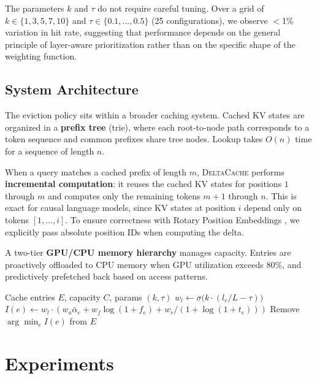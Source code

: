 \documentclass{article}
\newcommand{\deltacache}{\textsc{DeltaCache}}
\begin{document}
The parameters $k$ and $\tau$ do not require careful tuning. Over a grid of $k \in \{1,3,5,7,10\}$ and $\tau \in \{0.1,\ldots,0.5\}$ (25 configurations), we observe $<$1\% variation in hit rate, suggesting that performance depends on the general principle of layer-aware prioritization rather than on the specific shape of the weighting function.

\subsection{System Architecture}

The eviction policy sits within a broader caching system. Cached KV states are organized in a \textbf{prefix tree} (trie), where each root-to-node path corresponds to a token sequence and common prefixes share tree nodes. Lookup takes $O(n)$ time for a sequence of length $n$.

When a query matches a cached prefix of length $m$, \deltacache{} performs \textbf{incremental computation}: it reuses the cached KV states for positions $1$ through $m$ and computes only the remaining tokens $m{+}1$ through $n$. This is exact for causal language models, since KV states at position $i$ depend only on tokens $[1,\ldots,i]$. To ensure correctness with Rotary Position Embeddings \citep{su2024roformer}, we explicitly pass absolute position IDs when computing the delta.

A two-tier \textbf{GPU/CPU memory hierarchy} manages capacity. Entries are proactively offloaded to CPU memory when GPU utilization exceeds 80\%, and predictively prefetched back based on access patterns.

\begin{algorithm}[t]
\caption{Layer-Aware Cache Eviction}
\label{alg:eviction}
\begin{algorithmic}[1]
\Require Cache entries $E$, capacity $C$, params $(k, \tau)$
        \State $w_l \gets \sigma\big(k \cdot (l_e/L - \tau)\big)$ 
        \State $I(e) \gets w_l \cdot (w_a \bar{\alpha}_e + w_f \log(1{+}f_e) + w_r/(1{+}\log(1{+}t_e)))$
    \EndFor
    \State Remove $\arg\min_{e} I(e)$ from $E$
\EndWhile
\end{algorithmic}
\end{algorithm}

\section{Experiments}
\end{document}
